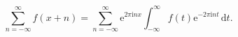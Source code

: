 \[\sum^{\infty}_{n=-\infty}f(x+n)=\sum^{\infty}_{n=-\infty}{\mathrm{e}}^{2\pi%
\mathrm{i}nx}\int^{\infty}_{-\infty}f(t){\mathrm{e}}^{-2\pi\mathrm{i}nt}\,%
\mathrm{d}t.\]